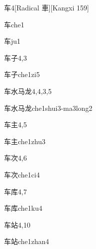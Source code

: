\begin{entry}{车}{4}[Radical 車][Kangxi 159]
  \begin{phonetics}{车}{che1}
  \end{phonetics}
  \begin{phonetics}{车}{ju1}
  \end{phonetics}
\end{entry}

\begin{entry}{车子}{4,3}
  \begin{phonetics}{车子}{che1zi5}
  \end{phonetics}
\end{entry}

\begin{entry}{车水马龙}{4,4,3,5}
  \begin{phonetics}{车水马龙}{che1shui3-ma3long2}
  \end{phonetics}
\end{entry}

\begin{entry}{车主}{4,5}
  \begin{phonetics}{车主}{che1zhu3}
  \end{phonetics}
\end{entry}

\begin{entry}{车次}{4,6}
  \begin{phonetics}{车次}{che1ci4}
  \end{phonetics}
\end{entry}

\begin{entry}{车库}{4,7}
  \begin{phonetics}{车库}{che1ku4}
  \end{phonetics}
\end{entry}

\begin{entry}{车站}{4,10}
  \begin{phonetics}{车站}{che1zhan4}
  \end{phonetics}
\end{entry}

